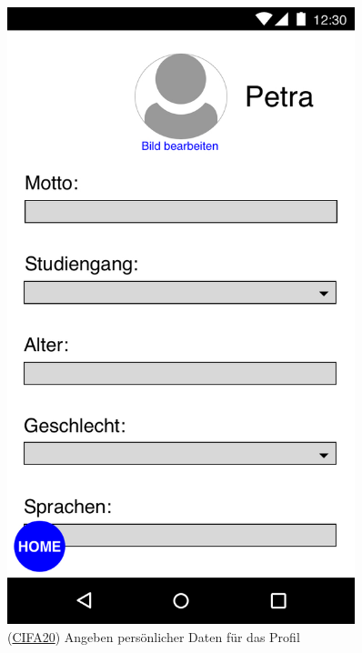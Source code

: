 \documentclass[a4paper]{scrreprt}
\begin{document}
\begin{figure}[H]
	\centering 
	\begin{minipage}[b]{0.48\textwidth} 
		\centering 
		\includegraphics[width=0.9\textwidth]{res/GUI/03.jpeg} 
		\label{Fig.3}
		(\hyperlink{cifa20}{CIFA20}) Angeben persönlicher Daten für das Profil
	\end{minipage}
	\begin{minipage}[b]{0.48\textwidth} 
		\centering 

\end{minipage}
\end{figure}
\end{document}
